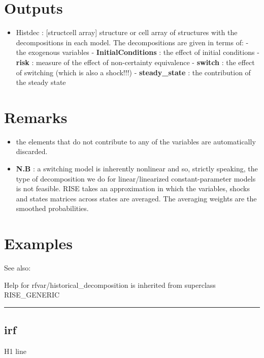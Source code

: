 \documentclass[letterpaper,10pt,english]{sphinxmanual}
\begin{document}
\section{Outputs}
\label{classes/models/@rfvar/rfvar:id34}\begin{itemize}
\item {} 
Histdec : {[}struct\textbar{}cell array{]} structure or cell array of structures
with the decompositions in each model. The decompositions are given in
terms of:
- the exogenous variables
- \textbf{InitialConditions} : the effect of initial conditions
- \textbf{risk} : measure of the effect of non-certainty equivalence
- \textbf{switch} : the effect of switching (which is also a shock!!!)
- \textbf{steady\_state} : the contribution of the steady state

\end{itemize}


\section{Remarks}
\label{classes/models/@rfvar/rfvar:remarks}\begin{itemize}
\item {} 
the elements that do not contribute to any of the variables are
automatically discarded.

\item {} 
\textbf{N.B} : a switching model is inherently nonlinear and so, strictly
speaking, the type of decomposition we do for linear/linearized
constant-parameter models is not feasible. RISE takes an approximation
in which the variables, shocks and states matrices across states are
averaged. The averaging weights are the smoothed probabilities.

\end{itemize}


\section{Examples}
\label{classes/models/@rfvar/rfvar:id35}
See also:

Help for rfvar/historical\_decomposition is inherited from superclass RISE\_GENERIC


\bigskip\hrule{}\bigskip



\subsection{irf}
\label{classes/models/@rfvar/rfvar:id36}\label{classes/models/@rfvar/rfvar:irf}
H1 line
\end{document}
